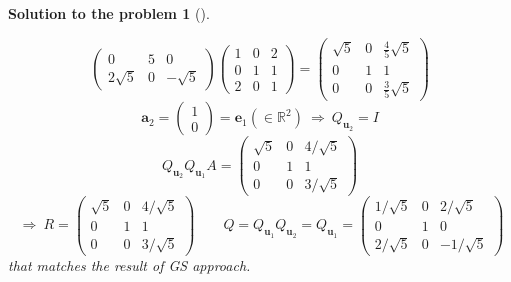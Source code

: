 \documentclass[12pt,a4]{article}
\newtheorem{solution}{Solution to the problem}
\newcommand{\ba}{{\mathbf a}}
\newcommand{\be}{{\mathbf e}}
\newcommand{\bu}{{\mathbf u}}
\begin{document}
\begin{solution}[]
\begin{enumerate}[(a)]
\[\begin{pmatrix}
0 & 5 & 0 \\
2\sqrt 5 & 0 & - \sqrt 5
\end{pmatrix}
\begin{pmatrix}
1 & 0 & 2 \\
0 & 1 & 1 \\
2 & 0 & 1
\end{pmatrix}
=
\begin{pmatrix}
\sqrt 5 & 0 & \frac{4}{5}\sqrt 5\\
0 & 1 & 1 \\
0 & 0 & \frac{3}{5}\sqrt 5
\end{pmatrix}
\]
\[
\ba_2 = \begin{pmatrix} 1 \\ 0  \end{pmatrix} = \be_1 (\in \mathbb{R}^2)
~\Rightarrow~
Q_{\bu_2} = I
\]
\[
Q_{\bu_2}Q_{\bu_1}A =
\begin{pmatrix}
\sqrt 5 & 0 & 4/\sqrt 5\\
0 & 1 & 1 \\
0 & 0 & 3/\sqrt 5
\end{pmatrix}
\]
\[
~\Rightarrow~
R =
\begin{pmatrix}
\sqrt 5 & 0 & 4/\sqrt 5\\
0 & 1 & 1 \\
0 & 0 & 3/\sqrt 5
\end{pmatrix}
\qquad
Q = Q_{\bu_1} Q_{\bu_2} = Q_{\bu_1} = 
\begin{pmatrix}
1/\sqrt 5 & 0 & 2/\sqrt 5\\
0 & 1 & 0 \\
2/\sqrt 5 & 0 & - 1/\sqrt 5
\end{pmatrix}
\]
that matches the result of GS approach.\\
\end{enumerate}
\end{solution}
\end{document}
